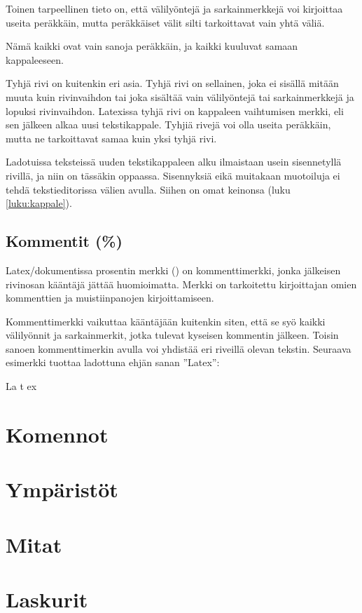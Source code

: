 Toinen tarpeellinen tieto on, että välilyöntejä ja sarkainmerkkejä voi
kirjoittaa useita peräkkäin, mutta peräkkäiset välit silti tarkoittavat
vain yhtä väliä.

\begin{koodilohkosis}
  Nämä      kaikki
       ovat        vain
  sanoja  peräkkäin,  ja      kaikki                    kuuluvat
      samaan kappaleeseen.     
\end{koodilohkosis}

Tyhjä rivi on kuitenkin eri asia. Tyhjä rivi on sellainen, joka ei
sisällä mitään muuta kuin rivinvaihdon tai joka sisältää vain
välilyöntejä tai sarkainmerkkejä ja lopuksi rivinvaihdon. Latexissa
tyhjä rivi on kappaleen vaihtumisen merkki, eli sen jälkeen alkaa uusi
tekstikappale. Tyhjiä rivejä voi olla useita peräkkäin, mutta ne
tarkoittavat samaa kuin yksi tyhjä rivi.

Ladotuissa teksteissä uuden tekstikappaleen alku ilmaistaan usein
sisennetyllä rivillä, ja niin on tässäkin oppaassa. Sisennyksiä eikä
muitakaan muotoiluja ei tehdä tekstieditorissa välien avulla. Siihen on
omat keinonsa (luku \ref{luku:kappale}).

\subsection{Kommentit (\%)}

Latex\-/dokumentissa prosentin merkki (\koodi{\%}) on kommenttimerkki,
jonka jälkeisen rivin\-osan kääntäjä jättää huomioimatta. Merkki on
tarkoitettu kirjoittajan omien kommenttien ja muistiinpanojen
kirjoittamiseen.

\begin{koodilohkosis}
\end{koodilohkosis}

Kommenttimerkki vaikuttaa kääntäjään kuitenkin siten, että se syö kaikki
välilyönnit ja sarkainmerkit, jotka tulevat kyseisen kommentin jälkeen.
Toisin sanoen kommenttimerkin avulla voi yhdistää eri riveillä olevan
tekstin. Seuraava esimerkki tuottaa ladottuna ehjän sanan ''Latex'':

\begin{koodilohkosis}
  La%
    t%
      ex
\end{koodilohkosis}

\section{Komennot}
\label{luku:komennot}
\section{Ympäristöt}
\section{Mitat}
\section{Laskurit}

